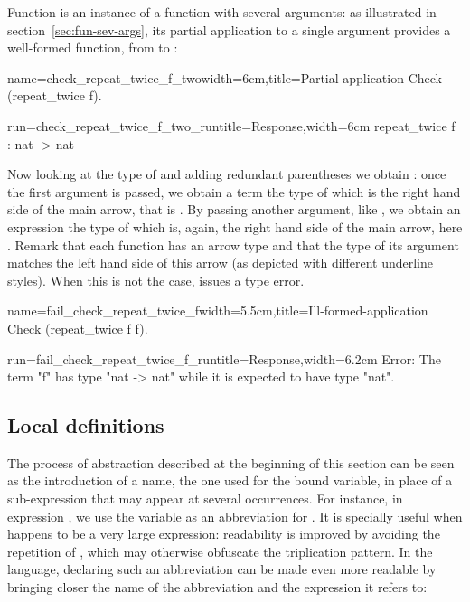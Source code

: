 Function   is an instance of a function with several
arguments: as illustrated in section~\ref{sec:fun-sev-args}, its
partial application to a single argument provides a well-formed
function, from  to :

\begin{coq-left}{name=check_repeat_twice_f_two}{width=6cm,title=Partial application}
Check (repeat_twice f).
\end{coq-left}
\begin{coqout-right}{run=check_repeat_twice_f_two_run}{title=Response,width=6cm}
repeat_twice f : nat -> nat
\end{coqout-right}

Now looking at the type of  and adding redundant parentheses
we obtain :
once the first argument
 is passed, we obtain a term the type of which is
the right hand side of the main arrow, that is .
By passing another argument, like , we obtain an expression
the type of which is, again, the right hand side of the main arrow,
here .
Remark that each function has an arrow type and that the type of its
argument matches the left hand side of this arrow (as depicted with
different underline styles). When this is not the case, \Coq{} issues a
type error.

\begin{coq-left}{name=fail_check_repeat_twice_f}{width=5.5cm,title=Ill-formed-application}
Check (repeat_twice f f).
\end{coq-left}
\begin{coqout-right}{run=fail_check_repeat_twice_f_run}{title=Response,width=6.2cm}
Error: The term "f" has type "nat -> nat"
while it is expected to have type "nat".
\end{coqout-right}

\subsection{Local definitions}

The process of abstraction described at the beginning of this section
can be seen as the introduction of a name, the one used for the bound
variable, in place of a sub-expression that may appear at
several occurrences. For instance, in expression
, we use the variable  as an
abbreviation for . It is specially useful when  happens to
be a very large expression: readability is improved by avoiding the
repetition of , which may otherwise obfuscate the triplication
pattern. In the \Coq{}
language, declaring such an abbreviation can be made even more
readable by bringing closer the name of the abbreviation  and the
expression it refers to:

